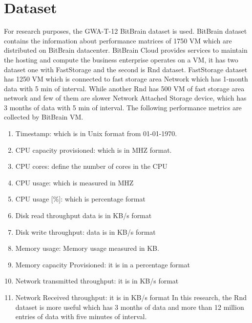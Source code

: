 \section{Dataset}
For research purposes, the GWA-T-12 BitBrain dataset\cite{shen2015statistical} is used. BitBrain dataset contains the information about performance matrices of 1750 VM which are distributed on BitBrain datacenter. BitBrain  Cloud provides services to maintain the hosting and compute the business enterprise operates on a VM, it has two dataset one with FastStorage and the second is Rnd dataset. FastStorage dataset has 1250 VM which is connected to fast storage area Network which has 1-month data with 5 min of interval. While another Rnd has 500 VM of fast storage area network and few of them are slower Network Attached Storage device, which has 3 months of data with 5 min of interval.
The following performance metrics are collected by BitBrain VM.
\begin{enumerate}
\item Timestamp: which is in Unix format from 01-01-1970.
\item CPU  capacity provisioned: which is in MHZ format.
\item CPU cores:     define the  number of cores in the CPU
\item CPU usage: which is measured in MHZ
\item CPU usage [\%]: which is percentage format
\item Disk read throughput data is in KB/s format
\item Disk write throughput:   data is in KB/s format
\item Memory usage: Memory usage measured in KB.
\item Memory capacity Provisioned:   it is in a percentage format
\item  Network transmitted throughput:  it is in KB/s format
\item  Network Received  throughput: it is in KB/s format
In this research, the Rnd dataset is more useful which has 3 months of data and more than  12 million entries of data with five minutes of interval.
\end{enumerate}

 
